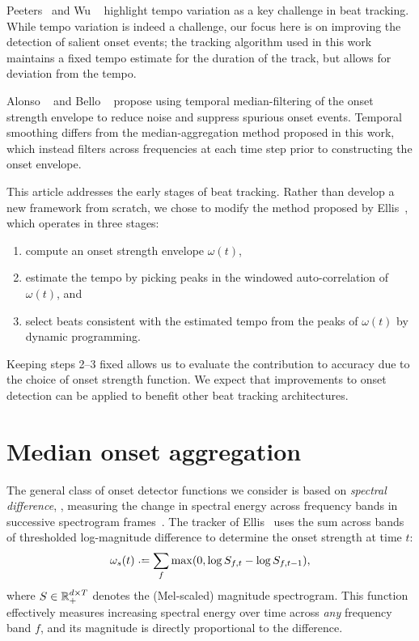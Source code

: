 \documentclass{article}
\begin{document}
Peeters~\cite{peeters2005time} and Wu \etal~\cite{wu2011two} highlight tempo variation as a 
key challenge in beat tracking. While tempo variation is indeed a challenge, our focus here 
is on improving the detection of salient onset events; the tracking algorithm used in
this work maintains a fixed tempo estimate for the duration of the track, but allows for
deviation from the tempo.

Alonso \etal~\cite{alonso2004tempo} and Bello \etal~\cite{bello2005tutorial} propose using 
temporal median-filtering of the onset strength envelope to reduce noise and suppress
spurious onset events.  Temporal smoothing differs from the median-aggregation method 
proposed in this work, which instead filters across frequencies at each time step prior to
constructing the onset envelope.

This article addresses the early stages of beat tracking.  Rather
than develop a new framework from scratch, we chose to modify the method
proposed by Ellis~\cite{ellis2007beat}, which operates in three stages:
\begin{enumerate}\addtolength{\itemsep}{-0.60\baselineskip}
\item compute an onset strength envelope $\omega(t)$,
\item estimate the tempo by picking peaks in the windowed auto-correlation of $\omega(t)$,
and
\item select beats consistent with the estimated tempo from the peaks of $\omega(t)$ by 
dynamic programming.
\end{enumerate}
Keeping steps 2--3 fixed allows us to evaluate the contribution to accuracy due to the
choice of onset strength function.
We expect that improvements to onset detection can be applied to benefit other beat
tracking architectures.

\section{Median onset aggregation}
\label{sec:onsets}
The general class of onset detector functions we consider is based on \emph{spectral 
difference}, \ie, measuring the change in spectral energy across frequency bands in 
successive spectrogram frames~\cite{bello2005tutorial}. The tracker 
of Ellis~\cite{ellis2007beat} uses the sum across bands of thresholded log-magnitude
difference to determine the onset strength at time $t$:
\begin{equation}
\omega_s(t) \defeq \sum_f \max(0, \log S_{f, t} - \log S_{f, t-1}),\label{eq:onset:sum}
\end{equation}
where $S \in \mathbb{R}_+^{d\times T}$ denotes the (Mel-scaled) magnitude spectrogram.  
This function effectively measures increasing spectral energy over time across 
\emph{any} frequency band $f$, and its magnitude is directly proportional to the 
difference.
\end{document}

